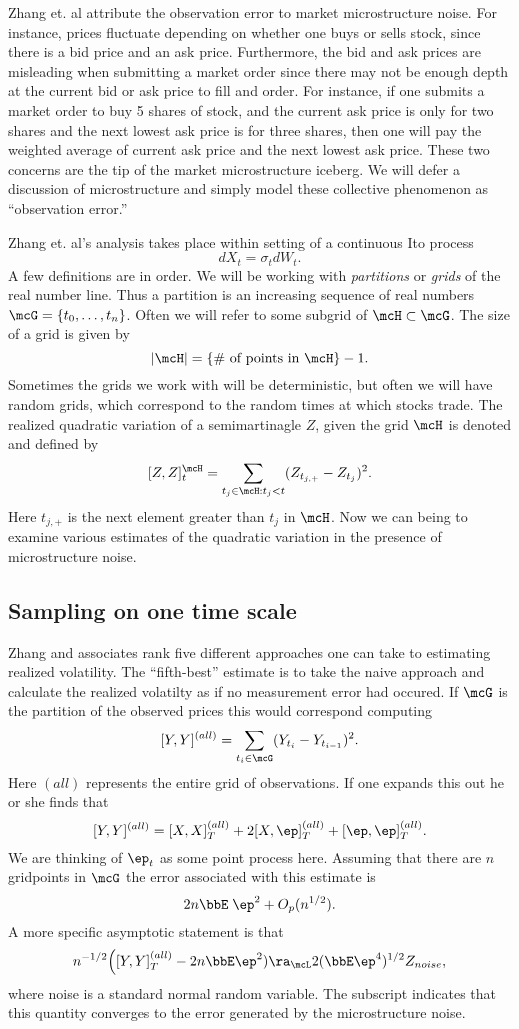 \documentclass{report}
\begin{document}
Zhang et. al attribute the observation error to market microstructure
noise.  For instance, prices fluctuate depending on whether one buys
or sells stock, since there is a bid price and an ask price. 
Furthermore, the bid and ask prices are misleading when submitting a
market order since there may not be enough depth at the current bid or
ask price to fill and order.  For instance, if one submits a market
order to buy 5 shares of stock, and the current ask price is only for
two shares and the next lowest ask price is for three shares, then one
will pay the weighted average of current ask price and the next lowest
ask price.  These two concerns are the tip of the market
microstructure iceberg.  We will defer a discussion of microstructure
and simply model these collective phenomenon as ``observation error.''

Zhang et. al's analysis takes place within setting of a continuous Ito
process
\[
dX_t = \sigma_t dW_t.
\]
A few definitions are in order.  We will be working with
\emph{partitions} or \emph{grids} of the real number line.  Thus a
partition is an increasing sequence of real numbers $\mcG = \{ t_0,
\ldots, t_n \}$.  Often we will refer to some subgrid of $\mcH \subset
\mcG$.  The size of a grid is given by 
\[
|\mcH| = \{ \textmd{\# of points in } \mcH \} - 1.
\]
Sometimes the grids we work with will be deterministic, but often we
will have random grids, which correspond to the random times at which
stocks trade.  The realized quadratic variation of a semimartinagle
$Z$, given the grid $\mcH$ is denoted and defined by
\[
[Z,Z]^\mcH_t = \sum_{t_j \in \mcH : t_j < t} (Z_{t_{j,+}}-Z_{t_j})^2.
\]
Here $t_{j,+}$ is the next element greater than $t_j$ in $\mcH$.  Now
we can being to examine various estimates of the quadratic variation
in the presence of microstructure noise.

\subsection{Sampling on one time scale}

Zhang and associates rank five different approaches one can take to
estimating realized volatility.  The ``fifth-best'' estimate is to
take the naive approach and calculate the realized volatilty as if no
measurement error had occured.  If $\mcG$ is the partition of the
observed prices this would correspond computing
\[
[Y,Y]^{(all)} = \sum_{t_i \in \mcG} (Y_{t_i} - Y_{t_{i-1}})^2.
\]
Here $(all)$ represents the entire grid of observations.  If one
expands this out he or she finds that
\[
[Y,Y]^{(all)} = [X,X]_T^{(all)} + 2 [X,\ep]_T^{(all)} +
[\ep,\ep]_T^{(all)}.
\]
We are thinking of $\ep_t$ as some point process here.
Assuming that there are $n$ gridpoints in $\mcG$ the error associated
with this estimate is
\[
2 n \bbE \; \ep^2 + O_p(n^{1/2}).
\]
A more specific asymptotic statement is that
\[
n^{-1/2} \Big( [Y,Y]^{(all)}_T - 2 n \bbE \ep^2 ) \ra_\mcL 2 (\bbE
\ep^4)^{1/2} Z_{noise},
\]
where noise is a standard normal random variable.  The subscript
indicates that this quantity converges to the error generated by the
microstructure noise.
\end{document}
